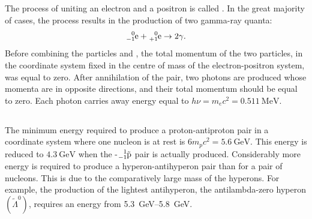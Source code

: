 \subsection{}\label{43.5.5} The process of uniting an electron and a positron is called . In the great majority of cases, the process results in the production of two gamma-ray quanta:
\begin{equation*}%
\ce{^{0}_{-1}e} + \ce{^{0}_{+1}e} \to 2 \gamma.
\end{equation*}
Before combining the particles  and , the total momentum of the two particles, in the coordinate system fixed in the centre of mass  of the electron-positron system, was equal to zero. After annihilation of the pair, two photons are produced whose momenta are in opposite directions, and their total momentum
should be equal to zero. Each photon carries away energy equal to $h\nu = m_{e}c^{2} = \SI{0.511}{\MeV}$.

\subsection{}\label{43.5.6} The minimum energy required to produce a proton-antiproton pair in a coordinate system where one nucleon is at rest is $6m_{p}c^{2} = \SI{5.6}{\GeV}$. This energy is reduced to $\SI{4.3}{\GeV}$
when the -$\ce{^{1}_{-1}\tilde{p}}$ pair is actually produced. Considerably more energy is required to produce a hyperon-antihyperon pair than for a pair of nucleons. This is due to the comparatively large mass of the hyperons. For example, the production of the lightest antihyperon, the antilambda-zero hyperon $(\tilde{\Lambda}^{0})$, requires an energy from \SIrange{5.3}{5.8}{\GeV}.

